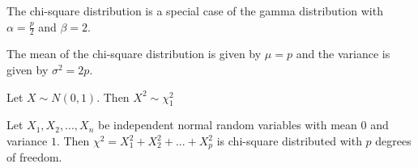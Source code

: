 The chi-square distribution is a special case of the gamma distribution with $\alpha = \frac{p}{2}$ and $\beta = 2$.

The mean of the chi-square distribution is given by $\mu = p$ and the variance is given by $\sigma^2 = 2p$.

\begin{prop}
Let $X \sim N(0,1)$. Then $X^2 \sim \chi_1^2$
\end{prop}

\begin{prop}
    Let $X_1, X_2, ..., X_n$ be independent normal random variables with mean $0$ and variance $1$. Then $\chi^2 = X_1^2 + X_2^2 + ... + X_p^2$ is chi-square distributed with $p$ degrees of freedom.
\end{prop}
